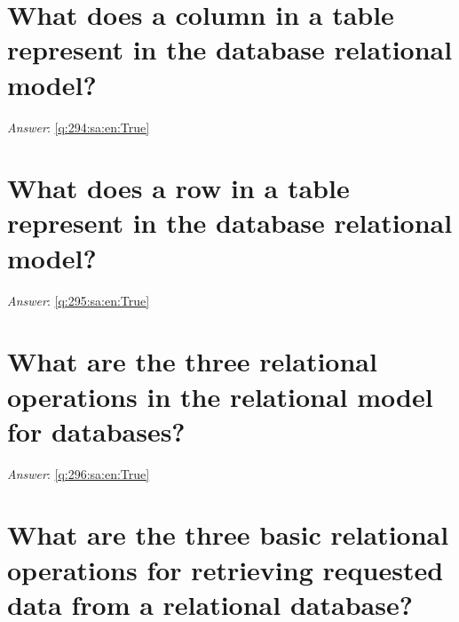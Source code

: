 \documentclass[a4paper,11pt,oneside]{book}
\begin{document}
\begin{sloppypar}
\section{What does a column in a table represent in the database relational model?}

\label{q:294:sa:en:False}

\vspace{2cm}

\noindent\makebox[\textwidth]{\hrulefill}

\vspace{1cm}

\textit{Answer}: \autoref{q:294:sa:en:True}



\section{What does a row in a table represent in the database relational model?}

\label{q:295:sa:en:False}

\vspace{2cm}

\noindent\makebox[\textwidth]{\hrulefill}

\vspace{1cm}

\textit{Answer}: \autoref{q:295:sa:en:True}



\section{What are the three relational operations in the relational model for databases?}

\label{q:296:sa:en:False}

\vspace{2cm}

\noindent\makebox[\textwidth]{\hrulefill}

\vspace{1cm}

\textit{Answer}: \autoref{q:296:sa:en:True}



\section{What are the three basic relational operations for retrieving requested data from a relational database?}

\label{q:297:sa:en:False}


\end{sloppypar}
\end{document}
